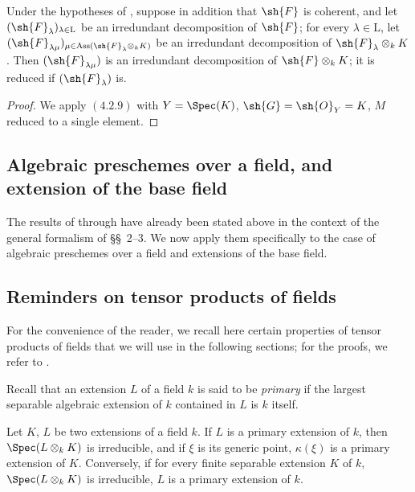\begin{corollary}[4.2.10]
\label{IV.4.2.10}
Under the hypotheses of , suppose in addition that $\sh{F}$ is coherent, and let $(\sh{F}_\lambda)_{\lambda\in\mathrm{L}}$ be an irredundant decomposition of $\sh{F}$; for every $\lambda\in\mathrm{L}$, let $(\sh{F}_{\lambda\mu})_{\mu\in\operatorname{Ass}(\sh{F}_\lambda\otimes_k K)}$ be an irredundant decomposition of $\sh{F}_\lambda\otimes_k K$.
Then $(\sh{F}_{\lambda\mu})$ is an irredundant decomposition of $\sh{F}\otimes_k K$; it is reduced if $(\sh{F}_\lambda)$ is.
\end{corollary}

\begin{proof}
We apply $(4.2.9)$ with $Y=\Spec(K)$, $\sh{G}=\sh{O}_Y=K$, $M$ reduced to a single element.
\end{proof}

\subsection{Algebraic preschemes over a field, and extension of the base field}
\label{subsection:IV.4.2}


The results of  through  have already been stated above in the context of the general formalism of \S\S~2--3.
We now apply them specifically to the case of algebraic preschemes over a field and extensions of the base field.

\subsection{Reminders on tensor products of fields}
\label{subsection:IV.4.3}


For the convenience of the reader, we recall here certain properties of tensor products of fields that we will use in the following sections; for the proofs, we refer to \cite{I}.

\begin{env}[4.3.1]
\label{IV.4.3.1}
Recall that an extension $L$ of a field $k$ is said to be \emph{primary} if the largest separable algebraic extension of $k$ contained in $L$ is $k$ itself.
\end{env}

\begin{proposition}[4.3.2]
\label{IV.4.3.2}
Let $K$, $L$ be two extensions of a field $k$.
If $L$ is a primary extension of $k$, then $\Spec(L\otimes_k K)$ is irreducible, and if $\xi$ is its generic point, $\kappa(\xi)$ is a primary extension of $K$.
Conversely, if for every finite separable extension $K$ of $k$, $\Spec(L\otimes_k K)$ is irreducible, $L$ is a primary extension of $k$.
\end{proposition}

